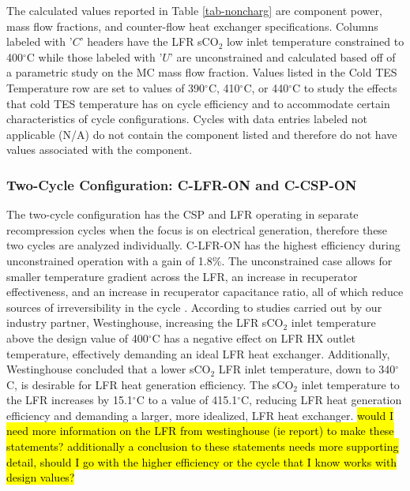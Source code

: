 \begin{paracol}{2}
\linenumbers
\switchcolumn

The calculated values reported in Table \ref{tab-noncharg} are component power, mass flow fractions, and counter-flow heat exchanger specifications. Columns labeled with '$C$' headers have the LFR sCO$_2$ low inlet temperature constrained to 400$^{\circ}$C while those labeled with '$U$' are unconstrained and calculated based off of a parametric study on the MC mass flow fraction. Values listed in the Cold TES Temperature row are set to values of 390$^{\circ}$C, 410$^{\circ}$C, or 440$^{\circ}$C to study the effects that cold TES temperature has on cycle efficiency and to accommodate certain characteristics of cycle configurations. Cycles with data entries labeled not applicable (N/A) do not contain the component listed and therefore do not have values associated with the component. 

\subsubsection{Two-Cycle Configuration: C-LFR-ON and C-CSP-ON}

The two-cycle configuration has the CSP and LFR operating in separate recompression cycles when the focus is on electrical generation, therefore these two cycles are analyzed individually. C-LFR-ON has the highest efficiency during unconstrained operation with a gain of 1.8\%. The unconstrained case allows for smaller temperature gradient across the LFR, an increase in recuperator effectiveness, and an increase in recuperator capacitance ratio, all of which reduce sources of irreversibility in the cycle \cite{klein_nellis_2011}. According to studies carried out by our industry partner, Westinghouse, increasing the LFR sCO$_2$ inlet temperature above the design value of 400$^{\circ}$C has a negative effect on LFR HX outlet temperature, effectively demanding an ideal LFR heat exchanger. Additionally, Westinghouse concluded that a lower sCO$_2$ LFR inlet temperature, down to 340$^{\circ}$C, is desirable for LFR heat generation efficiency. The sCO$_2$ inlet temperature to the LFR increases by 15.1$^{\circ}$C to a value of 415.1$^{\circ}$C, reducing LFR heat generation efficiency and demanding a larger, more idealized, LFR heat exchanger.   
\hl{would I need more information on the LFR from westinghouse (ie report) to make these statements? additionally a conclusion to these statements needs more supporting detail, should I go with the higher efficiency or the cycle that I know works with design values?}


\end{paracol}
